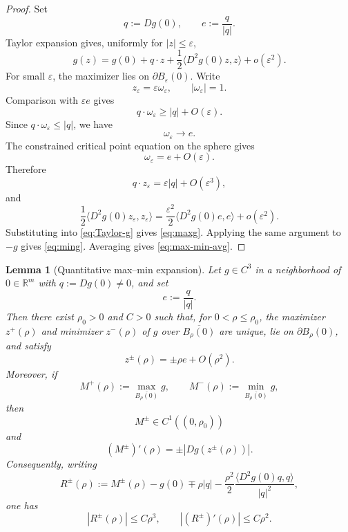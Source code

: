 \documentclass[12pt,reqno]{amsart}
\numberwithin{equation}{section}
\theoremstyle{plain}
\newtheorem{lemma}[lemma]{Lemma}
\theoremstyle{definition}
\theoremstyle{remark}
\newcommand{\R}{\mathbb{R}}
\begin{document}
\begin{proof}
Set
\[
  q:=Dg(0),
  \qquad
  e:=\frac{q}{|q|}.
\]
Taylor expansion gives, uniformly for $|z|\le\varepsilon$,
\begin{equation}\label{eq:Taylor-g}
  g(z)
  =
  g(0)
  +
  q\cdot z
  +
  \frac12\langle D^2g(0)z,z\rangle
  +
  o(\varepsilon^2).
\end{equation}
For small $\varepsilon$, the maximizer lies on $\partial B_\varepsilon(0)$.
Write
\[
  z_\varepsilon=\varepsilon\omega_\varepsilon,
  \qquad
  |\omega_\varepsilon|=1.
\]
Comparison with $\varepsilon e$ gives
\[
  q\cdot\omega_\varepsilon
  \ge
  |q|+O(\varepsilon).
\]
Since $q\cdot\omega_\varepsilon\le |q|$, we have
\[
  \omega_\varepsilon\to e.
\]
The constrained critical point equation on the sphere gives
\[
  \omega_\varepsilon=e+O(\varepsilon).
\]
Therefore
\[
  q\cdot z_\varepsilon
  =
  \varepsilon |q|+O(\varepsilon^3),
\]
and
\[
  \frac12\langle D^2g(0)z_\varepsilon,z_\varepsilon\rangle
  =
  \frac{\varepsilon^2}{2}
  \langle D^2g(0)e,e\rangle
  +
  o(\varepsilon^2).
\]
Substituting into \eqref{eq:Taylor-g} gives \eqref{eq:maxg}. Applying the
same argument to $-g$ gives \eqref{eq:ming}. Averaging gives
\eqref{eq:max-min-avg}.
\end{proof}

\begin{lemma}[Quantitative max--min expansion]
\label{lem:max-min-quantitative}
Let $g\in C^3$ in a neighborhood of $0\in\R^m$ with $q:=Dg(0)\ne0$, and
set
\[
  e:=\frac{q}{|q|}.
\]
Then there exist $\rho_0>0$ and $C>0$ such that, for
$0<\rho\le\rho_0$, the maximizer $z^+(\rho)$ and minimizer $z^-(\rho)$
of $g$ over $\overline{B_\rho(0)}$ are unique, lie on
$\partial B_\rho(0)$, and satisfy
\begin{equation}\label{eq:zpm-expansion}
  z^\pm(\rho)=\pm\rho e+O(\rho^2).
\end{equation}
Moreover, if
\[
  M^+(\rho):=
  \max_{\overline{B_\rho(0)}}g,
  \qquad
  M^-(\rho):=
  \min_{\overline{B_\rho(0)}}g,
\]
then
\[
  M^\pm\in C^1((0,\rho_0))
\]
and
\begin{equation}\label{eq:envelope-identity}
  (M^\pm)'(\rho)
  =
  \pm
  |Dg(z^\pm(\rho))|.
\end{equation}
Consequently, writing
\[
  R^\pm(\rho)
  :=
  M^\pm(\rho)-g(0)\mp\rho|q|
  -
  \frac{\rho^2}{2}
  \frac{\langle D^2g(0)q,q\rangle}{|q|^2},
\]
one has
\begin{equation}\label{eq:quantitative-remainder}
  |R^\pm(\rho)|\le C\rho^3,
  \qquad
  |(R^\pm)'(\rho)|\le C\rho^2.
\end{equation}
\end{lemma}
\end{document}
